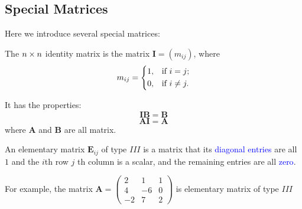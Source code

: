 \subsection{Special Matrices}
Here we introduce several special matrices:
\begin{definition}
The $n \times n$ identity matrix is the matrix $\bm I = (m_{ij})$, where 
\[
m_{ij} = \begin{dcases}
1, & \text{if } i =j; \\
0, & \text{if } i\ne j.
\end{dcases}
\]
\end{definition}
\begin{proposition}[Identity]
It has the properties:
\[\bm I \bm B = \bm B\]
\[\bm A \bm I = \bm A\]
where $\bm A$ and $\bm B$ are all matrix.
\end{proposition}

\begin{definition}
An elementary matrix $\bm{E}_{ij}$ of type $III$ is a matrix that its \textcolor{blue}{diagonal entries} are all $1$ and the $i$th row $j$ th column is a scalar, and the remaining entries are all \textcolor{blue}{zero}.
\end{definition}
For example, the matrix $\bm A = \begin{pmatrix}
2 & 1 & 1 \\ 4 & -6 & 0 \\ -2 & 7 & 2
\end{pmatrix}$ is elementary matrix of type $III$

